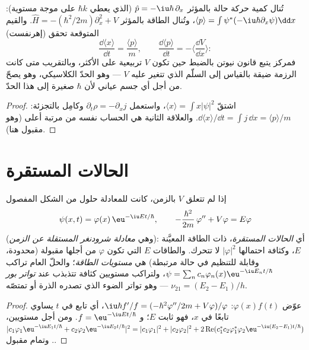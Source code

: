 \begin{proposition}\label{prop:b2:schrodinger-wave-functions:ehrenfest}
تُنال كمية حركة حالة بالمؤثر $\hat p =
-\iu\hbar\,\partial_x$ (الذي يعطي $\hbar k$ على موجة مستوية): $\langle
p\rangle = \int\psi^*(-\iu\hbar\partial_x\psi)\dd x$، وتُنال الطاقة بالمؤثر $\hat H
= -(\hbar^2/2m)\partial_x^2 + V$. والقيم المتوقعة تحقق
(إهرنفست)
\[
\frac{\dd\langle x\rangle}{\dd t} = \frac{\langle p\rangle}{m}, \qquad
\frac{\dd\langle p\rangle}{\dd t} = -\Big\langle\frac{\dd V}{\dd x}\Big\rangle :
\]
فمركز  يتبع قانون نيوتن بالضبط حين تكون $V$
تربيعية على الأكثر، وبالتقريب متى كانت الرزمة ضيقة
بالقياس إلى السلّم الذي تتغير عليه $V$ --- وهو الحدّ الكلاسيكي،
وهو يصحّ من أجل أي جسم عياني لأن $\hbar$ صغيرة إلى هذا الحدّ.
\end{proposition}

\begin{proof}
اشتقّ $\langle x\rangle = \int x|\psi|^2$، واستعمل $\partial_t\rho =
-\partial_xj$ وكامِل بالتجزئة: $\dd\langle x\rangle/\dd t = \int j\,\dd x
= \langle p\rangle/m$. والعلاقة الثانية هي الحساب نفسه من
مرتبة أعلى (وهو مقبول هنا).
\end{proof}

\section{الحالات المستقرة}

\begin{theorem}\label{thm:b2:schrodinger-wave-functions:stationary}
إذا لم تتعلق $V$ بالزمن، كانت للمعادلة حلول من الشكل
المفصول
\[
\psi(x,t) = \varphi(x)\,\eu^{-\iu Et/\hbar}, \qquad
-\frac{\hbar^2}{2m}\,\varphi'' + V\varphi = E\varphi
\]
(وهي \emph{معادلة شرودنغر المستقلة عن الزمن}): أي \emph{الحالات المستقرة}، ذات الطاقة المعيَّنة $E$، وكثافة احتمالها
$|\varphi|^2$ لا تتحرك. والطاقات $E$ التي تكون $\varphi$ من أجلها
مقبولة (محدودة، وقابلة للتنظيم في حالة مرتبطة) هي
\emph{مستويات الطاقة}؛ والحلّ العام تراكب $\psi =
\sum_nc_n\varphi_n(x)\eu^{-\iu E_nt/\hbar}$، ولتراكب مستويين
كثافة تتذبذب عند \emph{تواتر بور} $\nu_{21} = (E_2 - E_1)/h$ --- وهو تواتر الضوء الذي
تصدره الذرة أو تمتصّه.
\end{theorem}

\begin{proof}
عوّض $\varphi(x)f(t)$: $\iu\hbar f'/f = (-\hbar^2\varphi''/2m + V\varphi)/\varphi$،
أي تابع في $t$ يساوي تابعًا في $x$، فهو ثابت $E$؛ و $f
= \eu^{-\iu Et/\hbar}$. ومن أجل مستويين، $|c_1\varphi_1\eu^{-\iu E_1t/\hbar} +
c_2\varphi_2\eu^{-\iu E_2t/\hbar}|^2 = |c_1\varphi_1|^2 + |c_2\varphi_2|^2 +
2\operatorname{Re}(c_1^*c_2\varphi_1^*\varphi_2\eu^{-\iu(E_2 - E_1)t/\hbar})$.
وتمام  مقبول.
\end{proof}

